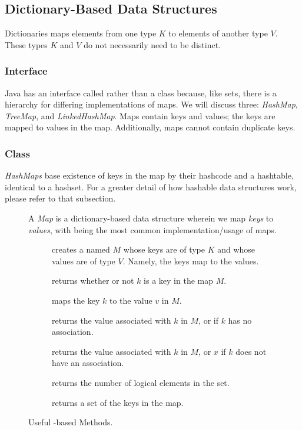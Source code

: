 \subsection{Dictionary-Based Data Structures}
Dictionaries maps elements from one type $K$ to elements of another type $V$. These types $K$ and $V$ do not necessarily need to be distinct. 

\subsubsection*{ Interface}
Java has an interface called  rather than a class because, like sets, there is a hierarchy for differing implementations of maps. We will discuss three: \emph{HashMap}, \emph{TreeMap}, and \emph{LinkedHashMap}. Maps contain keys and values; the keys are mapped to values in the map. Additionally, maps cannot contain duplicate keys.

\subsubsection*{ Class}
\emph{HashMaps} base existence of keys in the map by their hashcode and a hashtable, identical to a hashset. For a greater detail of how hashable data structures work, please refer to that subsection.
\begin{figure}[tp]
  \small
  \begin{tcolorbox}[title=Java Maps]
    A \emph{Map} is a dictionary-based data structure wherein we map \emph{keys} to \emph{values}, with  being the most common implementation/usage of maps.
    \vspace{2ex}
  \begin{description}
    \item [] creates a  named $M$ whose keys are of type $K$ and whose values are of type $V$. Namely, the keys map to the values.
     \item [] returns whether or not $k$ is a key in the map $M$.
     \item [] maps the key $k$ to the value $v$ in $M$.
     \item [] returns the value associated with $k$ in $M$, or  if $k$ has no association.
     \item [] returns the value associated with $k$ in $M$, or $x$ if $k$ does not have an association.
    \item [] returns the number of logical elements in the set.
    \item [] returns a set of the keys in the map.
  \end{description}
\end{tcolorbox}
  \caption{Useful -based Methods.}
  \label{fig:hashmap}
\end{figure}

